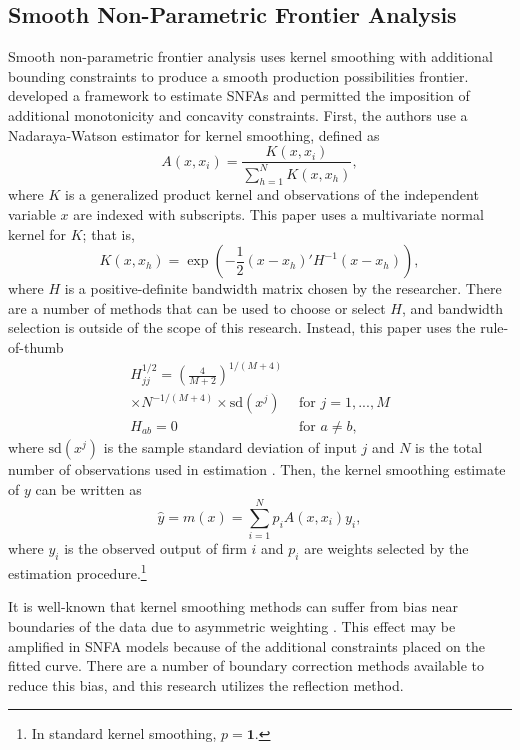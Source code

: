 \documentclass[twocolumn]{article}
\begin{document}
\subsection{Smooth Non-Parametric Frontier Analysis}

Smooth non-parametric frontier analysis uses kernel smoothing with additional bounding constraints to produce a smooth production possibilities frontier. \cite{ParmeterRacine} developed a framework to estimate SNFAs and permitted the imposition of additional monotonicity and concavity constraints. First, the authors use a Nadaraya-Watson estimator for kernel smoothing, defined as
\begin{equation}
	A(x, x_i) = \frac{K(x, x_i)}{\sum_{h=1}^N K(x, x_h)},
\end{equation}
where $K$ is a generalized product kernel and observations of the independent variable $x$ are indexed with subscripts. This paper uses a multivariate normal kernel for $K$; that is,
\begin{equation}
	K(x, x_h) = \exp\left(-\frac12 (x - x_h)'H^{-1}(x - x_h)\right),
\end{equation}
where $H$ is a positive-definite bandwidth matrix chosen by the researcher. There are a number of methods that can be used to choose or select $H$, and bandwidth selection is outside of the scope of this research. Instead, this paper uses the rule-of-thumb
\begin{align}
	\nonumber
	H_{jj}^{1/2} = \left(\frac{4}{M + 2}\right)^{1 / (M + 4)}\\\nonumber\times N^{-1 / (M + 4)}\times \mbox{sd}(x^j) &\mbox{\ \ \ \ for }j=1,...,M\\
	\nonumber
	H_{ab} = 0 &\mbox{\ \ \ \ for }a\neq b, 
\end{align}
where $\mbox{sd}(x^j)$ is the sample standard deviation of input $j$ and $N$ is the total number of observations used in estimation \citep{Silverman}. Then, the kernel smoothing estimate of $y$ can be written as
\begin{equation}
	\label{eqn:kernelEstimate}
	\hat{y} = m(x) = \sum_{i=1}^N p_i A(x, x_i) y_i,
\end{equation}
where $y_i$ is the observed output of firm $i$ and $p_i$ are weights selected by the estimation procedure.\footnote{In standard kernel smoothing, $p = \mathbf{1}$.}

It is well-known that kernel smoothing methods can suffer from bias near boundaries of the data due to asymmetric weighting \citep{Silverman}. This effect may be amplified in SNFA models because of the additional constraints placed on the fitted curve. There are a number of boundary correction methods available to reduce this bias, and this research utilizes the reflection method. 
\end{document}
